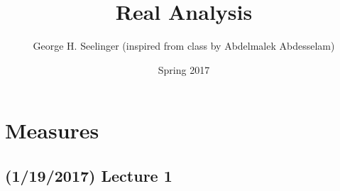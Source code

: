 \documentclass[11pt,leqno,oneside]{amsart}
\title[Real Analysis]{Real Analysis}
\author{George H. Seelinger (inspired from class by Abdelmalek Abdesselam)}
\date{Spring 2017}
\numberwithin{thm}{section}
\begin{document}
\maketitle
\section{Measures}
\subsection*{(1/19/2017) Lecture 1}
\end{document}
